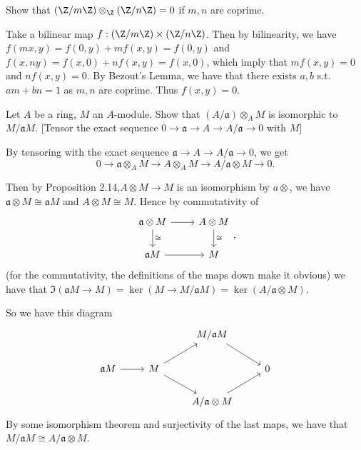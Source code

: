 \begin{questions}
	\question Show that $(\Z / m\Z) \otimes _{\Z} (\Z/n\Z) = 0$ if $m,n$ are coprime.
	\begin{solution}
		Take a bilinear map $f: (\Z / m\Z) \times (\Z / n\Z)$.
		Then by bilinearity, we have $f(mx,y) = f(0,y) + mf(x,y) = f(0,y)$ and $f(x,ny) = f(x,0) + nf(x,y) = f(x,0) $, which imply that $mf(x,y) = 0$ and $nf(x,y) = 0$.
		By Bezout's Lemma, we have that there exists $a,b$ s.t. $am+bn = 1$ as $m,n$ are coprime.
		Thus $f(x,y) = 0$.
	\end{solution}

	\question Let $A$ be a ring, $M$ an $A$-module. Show that $(A / \mathfrak{a}) \otimes_A M$ is isomorphic to $M / \mathfrak{a}M$. [Tensor the exact sequence $0\to \mathfrak{a}\to A\to A / \mathfrak{a} \to 0$ with $M $]
	\begin{solution}
		By tensoring with the exact sequence $\mathfrak{a}\to A \to A / \mathfrak{a} \to 0 $, we get
		\[
			0 \to \mathfrak{a}\otimes_A M \to A \otimes_A M \to A / \mathfrak{a} \otimes M \to 0 \tag{Prop 2.8}
		.\]

		Then by Proposition 2.14,$A \otimes M \to M$ is an isomorphism by $a\otimes  $, we have $\mathfrak{a}\otimes M \cong \mathfrak{a}M$ and $A\otimes M \cong M$.
		Hence by commutativity of
		\[
			\begin{tikzcd}
				\mathfrak{a}\otimes M & A \otimes M\\
				\mathfrak{a}M & M
				\arrow[from=1-1,to=1-2]
				\arrow["\cong",from=1-1,to=2-1]
				\arrow[from=2-1,to=2-2]
				\arrow["\cong",from=1-2,to=2-2]
			\end{tikzcd}
		,\]
		(for the commutativity, the definitions of the maps down make it obvious) we have that $\Im(\mathfrak{a}M\to M)= \ker(M\to M / \mathfrak{a}M) = \ker(A / \mathfrak{a}\otimes M)$.

		So we have this diagram
		\[
			\begin{tikzcd}
				&& M / \mathfrak{a}M &\\
				\mathfrak{a}M & M &&0\\
					      && A / \mathfrak{a} \otimes M &
					      \arrow[from=2-1,to=2-2]
					      \arrow[from=2-2,to=1-3]
					      \arrow[from=2-2,to=3-3]
					      \arrow[from=3-3,to=2-4]
					      \arrow[from=1-3,to=2-4]
			\end{tikzcd}
		\]
		By some isomorphism theorem and surjectivity of the last maps, we have that $M / \mathfrak{a}M \cong A / \mathfrak{a} \otimes M$.
	\end{solution}


\end{questions}
